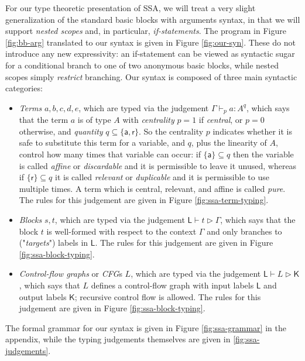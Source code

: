 \documentclass[acmsmall,screen,review]{acmart}
\newcommand{\ms}[1]{\ensuremath{\mathsf{#1}}}
\newcommand{\taff}{{\{\ms{a}\}}}
\newcommand{\trel}{{\{\ms{r}\}}}
\newcommand{\hasty}[5]{#1 \vdash_{#2} #3: {#4}^{#5}}
\newcommand{\haslb}[3]{#1 \vdash #2 \rhd #3}
\newcommand{\lhaslb}[3]{#1 \vdash #2 \rhd #3}
\begin{document}
For our type theoretic presentation of SSA, we will treat a very slight
generalization of the standard basic blocks with arguments syntax, in that we
will support \textit{nested scopes} and, in particular, \textit{if-statements}.
The program in Figure \ref{fig:bb-arg} translated to our syntax is given in
Figure \ref{fig:our-syn}. These do not introduce any new expressivity: an
if-statement can be viewed as syntactic sugar for a conditional branch to one of
two anonymous basic blocks, while nested scopes simply \textit{restrict}
branching. Our syntax is composed of three main syntactic categories:
\begin{itemize}
  \item \textit{Terms} \(a, b, c, d, e\), which are typed via the judgement
  \(\hasty{\Gamma}{p}{a}{A}{q}\), which says that the term \(a\) is of type
  \(A\) with \textit{centrality} \(p = 1\) if \textit{central}, or \(p = 0\)
  otherwise, and \textit{quantity} \(q \subseteq \{\ms{a}, \ms{r}\}\). So the
  centrality \(p\) indicates whether it is safe to substitute this term for a
  variable, and \(q\), plus the linearity of \(A\), control how many times that
  variable can occur: if \(\taff \subseteq q\) then the variable is called
  \textit{affine} or \textit{discardable} and it is permissible to leave it
  unused, whereas if \(\trel \subseteq q\) it is called \textit{relevant} or
  \textit{duplicable} and it is permissible to use multiple times. A term which
  is central, relevant, and affine is called \textit{pure}. The rules for this
  judgement are given in Figure \ref{fig:ssa-term-typing}.
  
  \item \textit{Blocks} \(s, t\), which are typed via the judgement
  \(\haslb{\ms{L}}{t}{\Gamma}\), which says that the block \(t\) is well-formed
  with respect to the context \(\Gamma\) and only branches to
  ("\textit{targets}") labels in \(\ms{L}\). The rules for this judgement are
  given in Figure \ref{fig:ssa-block-typing}.

\item \textit{Control-flow graphs} or \textit{CFG}s \(L\), which are typed via
  the judgement \(\lhaslb{\ms{L}}{L}{\ms{K}}\), which says that \(L\) defines a
  control-flow graph with input labels \(\ms{L}\) and output labels \(\ms{K}\);
  recursive control flow is allowed. The rules for this judgement are given in
  Figure \ref{fig:ssa-block-typing}.
\end{itemize}
The formal grammar for our syntax is given in Figure \ref{fig:ssa-grammar} in
the appendix, while the typing judgements themselves are given in
\ref{fig:ssa-judgements}. 
\end{document}
